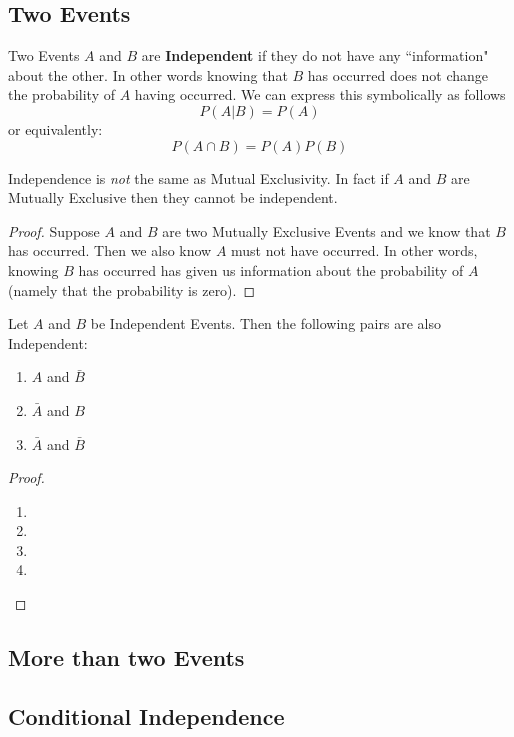 \documentclass{report}
\begin{document}
\subsection{Two Events}
Two Events $A$ and $B$ are \textbf{Independent} if they do not have any ``information" about the other. In other words knowing that $B$ has occurred does not change the probability of $A$ having occurred. We can express this symbolically as follows
\[
    P(A|B)=P(A)
\]
or equivalently:
\[
    P(A\cap B)=P(A)P(B)
\]
\begin{notsofast}
    Independence is \emph{not} the same as Mutual Exclusivity. In fact if $A$ and $B$ are Mutually Exclusive then they cannot be independent. 
    \begin{proof}
        Suppose $A$ and $B$ are two Mutually Exclusive Events and we know that $B$ has occurred. Then we also know $A$ must not have occurred. In other words, knowing $B$ has occurred has given us information about the probability of $A$ (namely that the probability is zero). 
    \end{proof}
\end{notsofast}

\begin{lemma}
Let $A$ and $B$ be Independent Events. Then the following pairs are also Independent:
\begin{enumerate}
    \item $A$ and $\bar B$
    \item $\bar A$ and $B$
    \item $\bar A$ and $\bar B$
\end{enumerate}

\begin{proof}
    \begin{enumerate}
        \item[]
        \item\todo
        \item\todo
        \item \todo
    \end{enumerate}
\end{proof}
\end{lemma}

\subsection{More than two Events}

\subsection{Conditional Independence}
\end{document}

